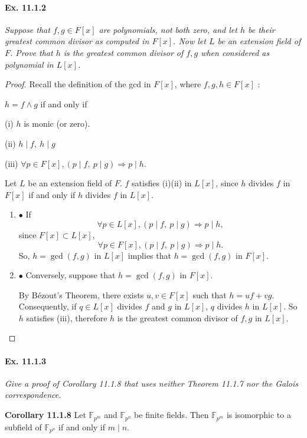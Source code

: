 \documentclass[11pt,a4paper]{article}
\newcommand{\be} {\begin{enumerate}}
\newcommand{\ee} {\end{enumerate}}
\newcommand{\F}{\mathbb{F}}
\begin{document}
\paragraph{Ex. 11.1.2}

{\it Suppose that $f,g \in F[x]$ are polynomials, not both zero, and let $h$ be their greatest common divisor as computed in $F[x]$. Now let $L$ be an extension field of $F$. Prove that $h$ is the greatest common divisor of $f,g$ when considered as polynomial in $L[x]$.
}

\begin{proof}
Recall the definition of the gcd in $F[x]$, where $f,g,h \in F[x]$ : 

$h = f\wedge g$ if and only if

(i) $h$ is monic (or zero).

(ii) $h \mid f,\  h \mid g$

(iii) $\forall p \in F[x], (p \mid f,\  p \mid g) \Rightarrow p \mid h$.

Let $L$ be an extension field of $F$. $f$ satisfies (i)(ii) in $L[x]$, since $h$ divides $f$ in $F[x]$ if and only if $h$ divides $f$ in $L[x]$.

\be 
\item[$\bullet$] If
$$\forall p \in L[x], (p \mid f,\  p \mid g) \Rightarrow p \mid h,$$
since $F[x] \subset L[x]$,
$$\forall p \in F[x], (p \mid f,\  p \mid g) \Rightarrow p \mid h.$$
So, $h = \gcd(f,g)$ in $L[x]$ implies that $h = \gcd(f,g)$ in $F[x]$.

\item[$\bullet$] Conversely, suppose that $h = \gcd(f,g)$ in $F[x]$.

By B\'ezout's Theorem, there exists $u,v \in F[x]$ such that $h = uf +vg$. Consequently, if $q \in L[x]$ divides $f$ and $g$ in $L[x]$, $q$ divides $h$ in $L[x]$. So $h$ satisfies (iii), therefore $h$ is the greatest common divisor of $f,g$ in $L[x]$.
\ee
\end{proof}

\paragraph{Ex. 11.1.3}

{\it Give a proof of Corollary 11.1.8 that uses neither Theorem 11.1.7 nor the Galois correspondence.

\medskip

{\bf Corollary 11.1.8} Let $\F_{p^m}$ and $\F_{p^n}$ be finite fields. Then $\F_{p^m}$ is isomorphic to a subfield of $\F_{p^n}$ if and only if $m\mid n$.
}
\end{document}
